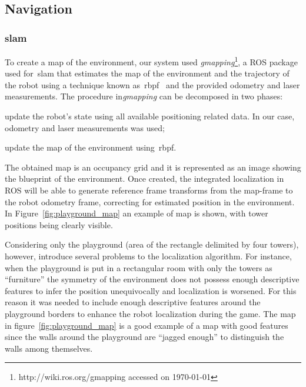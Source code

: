 
\subsection{Navigation}
\subsubsection{\glsdesc{slam}}\label{gmapping}
To create a map of the environment, our system used \textit{gmapping}\footnote{http://wiki.ros.org/gmapping accessed on \today}, a ROS package used for~\gls{slam} that estimates the map of the environment and the trajectory of the robot using a technique known as~\gls{rbpf}~\citep{grisettiyz_improving_2005} and the provided odometry and laser measurements. The procedure in\textit{gmapping} can be decomposed in two phases: \begin{inparaenum}\item update the robot's state using all available positioning related data. In our case, odometry and laser measurements was used; \item update the map of the environment using~\gls{rbpf}.\end{inparaenum}

The obtained map is an occupancy grid and it is represented as an image showing the blueprint of the environment. Once created, the integrated localization in ROS will be able to generate reference frame transforms from the map-frame to the robot odometry frame, correcting for estimated position in the environment. In Figure~\ref{fig:playground_map} an example of map is shown, with tower positions being clearly visible.

Considering only the playground (area of the rectangle delimited by four towers), however, introduce several problems to the localization algorithm. For instance, when the playground is put in a rectangular room with only the towers as ``furniture'' the symmetry of the environment does not possess enough descriptive features to infer the position unequivocally and localization is worsened. For this reason it was needed to include enough descriptive features around the playground borders to enhance the robot localization during the game. The map in figure~\ref{fig:playground_map} is a good example of a map with good features since the walls around the playground are ``jagged enough'' to distinguish the walls among themselves. 

